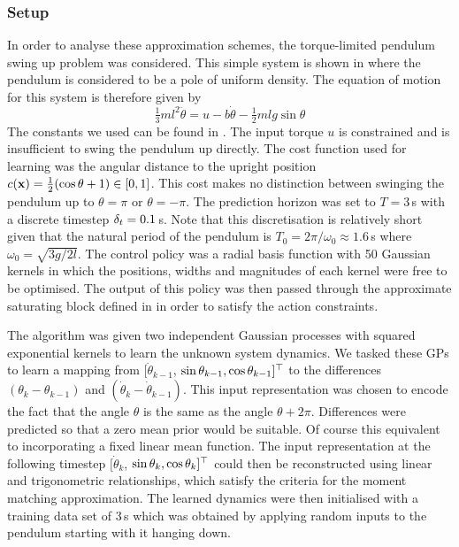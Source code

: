 \subsubsection{Setup}
In order to analyse these approximation schemes, the torque-limited pendulum swing up problem was considered. This simple system is shown in  where the pendulum is considered to be a pole of uniform density. The equation of motion for this system is therefore given by
\begin{equation*}
\tfrac{1}{3}ml^2 \ddot{\theta} = u - b\dot\theta - \tfrac{1}{2}mlg\sin\theta
\end{equation*}
The constants we used can be found in . The input torque $u$ is constrained and is insufficient to swing the pendulum up directly.
%
The cost function used for learning was the angular distance to the upright position $c(\mathbf{x}) = \tfrac{1}{2}(\cos\theta+1) \in [0,1]$. This cost makes no distinction between swinging the pendulum up to $\theta=\pi$ or $\theta=-\pi$. The prediction horizon was set to $T = 3\,$s with a discrete timestep $\delta_t = 0.1\,$s. Note that this discretisation is relatively short given that the natural period of the pendulum is $T_0 = 2\pi/\omega_0 \approx 1.6\,$s where $\omega_0 = \sqrt{3g/2l}$.
The control policy was a radial basis function with 50 Gaussian kernels in which the positions, widths and magnitudes of each kernel were free to be optimised. The output of this policy was then passed through the approximate saturating block defined in  in order to satisfy the action constraints. 


The algorithm was given two independent Gaussian processes with squared exponential kernels to learn the unknown system dynamics. We tasked these GPs to learn a mapping from $[\dot\theta_{k-1}$, $\sin\theta_{k-1}, \cos\theta_{k-1}]^\top$ to the differences $(\theta_k-\theta_{k-1})$ and $(\dot\theta_k-\dot\theta_{k-1})$. This input representation was chosen to encode the fact that the angle $\theta$ is the same as the angle $\theta+2\pi$. Differences were predicted so that a zero mean prior would be suitable. Of course this equivalent to incorporating a fixed linear mean function. The input representation at the following timestep $[\dot\theta_{k}$, $\sin\theta_{k}, \cos\theta_{k}]^\top$ could then be reconstructed using linear and trigonometric relationships, which satisfy the criteria for the moment matching approximation.
%
The learned dynamics were then initialised with a training data set of 3$\,$s which was obtained by applying random inputs to the pendulum starting with it hanging down.

